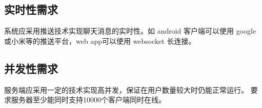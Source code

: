 % 
% 
% 
% 
% 
% 
% 
% 
% 
% 

\subsection{实时性需求}

系统应采用推送技术实现聊天消息的实时性。如 android 客户端可以使用 google 或小米等的推送平台，web app可以使用 websocket 长连接。

\subsection{并发性需求}

服务端应采用一定的技术实现高并发，保证在用户数量较大时仍能正常运行。
要求服务器至少能同时支持10000个客户端同时在线。

